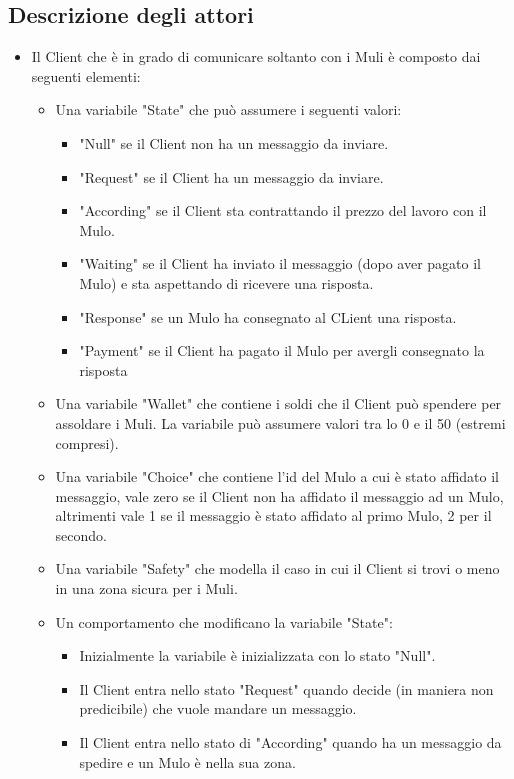 \documentclass[13pt,a4paper]{article}
\begin{document}
\subsection{Descrizione degli attori}
\begin{itemize}
	\item Il Client che è in grado di comunicare soltanto con i Muli è composto dai seguenti elementi:
	\begin{itemize}
		\item Una variabile "State" che può assumere i seguenti valori:
		\begin{itemize}
			\item "Null" se il Client non ha un messaggio da inviare.
			\item "Request" se il Client ha un messaggio da inviare.
			\item "According" se il Client sta contrattando il prezzo del lavoro con il Mulo.
			\item "Waiting" se il Client ha inviato il messaggio (dopo aver pagato il Mulo) e sta aspettando di ricevere una risposta.
			\item "Response" se un Mulo ha consegnato al CLient una risposta.
			\item "Payment" se il Client ha pagato il Mulo per avergli consegnato la risposta
		\end{itemize}
		\item Una variabile "Wallet" che contiene i soldi che il Client può spendere per assoldare i Muli. La variabile può assumere valori tra lo 0 e il 50 (estremi compresi).
		\item Una variabile "Choice" che contiene l'id del Mulo a cui è stato affidato il messaggio, vale zero se il Client non ha  affidato il messaggio ad un Mulo, altrimenti vale 1 se il messaggio è stato affidato al primo Mulo, 2 per il secondo.
		\item Una variabile "Safety" che modella il caso in cui il Client si trovi o meno in una zona sicura per i Muli.
		\item Un comportamento che modificano la variabile "State":
		\begin{itemize}
			\item Inizialmente la variabile è inizializzata con lo stato "Null".
			\item Il Client entra nello stato "Request" quando decide (in maniera non predicibile) che vuole mandare un messaggio.
			\item Il Client entra nello stato di "According" quando ha un messaggio da spedire e un Mulo è nella sua zona.

\end{itemize}
\end{itemize}
\end{itemize}
\end{document}
